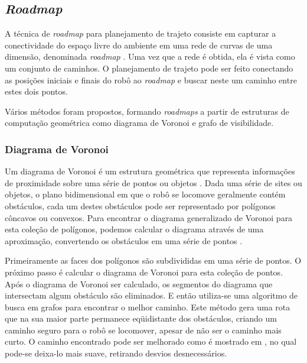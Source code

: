 \documentclass[12pt]{article}
\begin{document}
\subsection{\textit{Roadmap}}
      A técnica de \textit{roadmap} para planejamento de trajeto consiste em capturar a conectividade
      do espaço livre do ambiente em uma rede de curvas de uma dimensão, denominada \textit{roadmap} \cite{planejamentoTrajetorias}. 
      Uma vez que a rede é obtida, ela é vista como um conjunto de caminhos. O planejamento de trajeto pode ser feito 
      conectando as posições iniciais e finais do robô ao \textit{roadmap} e buscar neste um caminho entre estes 
      dois pontos.
      
      Vários métodos foram propostos, formando \textit{roadmaps} a partir de estruturas de computação 
      geométrica como diagrama de Voronoi e grafo de visibilidade.
      
\subsubsection{Diagrama de Voronoi}
Um diagrama de Voronoi é um estrutura geométrica que
representa informações de proximidade sobre uma série de
pontos ou objetos \cite{tecnicasNavegacao}. Dada uma série de sites ou objetos, o plano
bidimensional em que o robô se locomove geralmente contém
obstáculos, cada um destes obstáculos pode ser representado
por polígonos côncavos ou convexos. Para encontrar o
diagrama generalizado de Voronoi para esta coleção de
polígonos, podemos calcular o diagrama através de uma
aproximação, convertendo os obstáculos em uma série de
pontos \cite{voronoi}. 

  Primeiramente as faces dos polígonos são
subdivididas em uma série de pontos. O próximo passo é
calcular o diagrama de Voronoi para esta coleção de pontos.
Após o diagrama de Voronoi ser calculado, os segmentos do
diagrama que intersectam algum obstáculo são eliminados. E então 
utiliza-se uma algoritmo de busca em grafos para encontrar o melhor caminho.
Este método gera uma rota que na sua maior parte
permanece eqüidistante dos obstáculos, criando um
caminho seguro para o robô se locomover, apesar de não ser o
caminho mais curto. 
  O caminho encontrado pode ser melhorado como é mostrado em \cite{voronoi}, no qual pode-se 
  deixa-lo mais suave, retirando desvios desnecessários.
  
\end{document}
